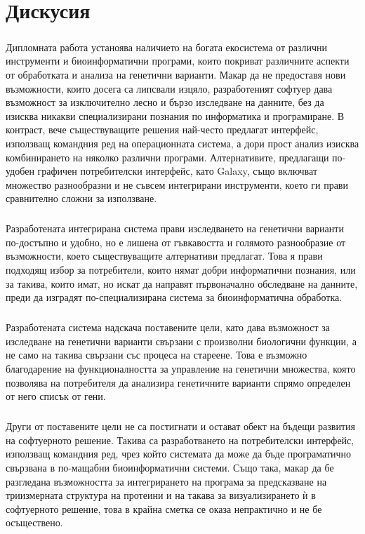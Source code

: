 \documentclass[pdftex,cyrillic,14pt,a4page,twoside,openright]{extreport}
\begin{document}
\chapter{Дискусия}
\paragraph{}
Дипломната работа устаноява наличието на богата екосистема от различни инструменти и биоинформатични програми, които покриват различните аспекти от обработката и анализа на генетични варианти. Макар да не предоставя нови възможности, които досега са липсвали изцяло, разработеният софтуер дава възможност за изключително лесно и бързо изследване на данните, без да изисква никакви специализирани познания по информатика и програмиране. В контраст, вече съществуващите решения най-често предлагат интерфейс, използващ командния ред на операционната система, а дори прост анализ изисква комбинирането на няколко различни програми. Алтернативите, предлагащи по-удобен графичен потребителски интерфейс, като Galaxy, също включват множество разнообразни и не съвсем интегрирани инструменти, което ги прави сравнително сложни за използване.

\paragraph{}
Разработената интегрирана система прави изследването на генетични варианти по-достъпно и удобно, но е лишена от гъвкавостта и голямото разнообразие от възможности, което съществуващите алтернативи предлагат. Това я прави подходящ избор за потребители, които нямат добри информатични познания, или за такива, които имат, но искат да направят първоначално обследване на данните, преди да изградят по-специализирана система за биоинформатична обработка.

\paragraph{}
Разработената система надскача поставените цели, като дава възможност за изследване на генетични варианти свързани с произволни биологични функции, а не само на такива свързани със процеса на стареене. Това е възможно благодарение на функционалността за управление на генетични множества, която позволява на потребителя да анализира генетичните варианти спрямо определен от него списък от гени.

\paragraph{}
Други от поставените цели не са постигнати и остават обект на бъдещи развития на софтуерното решение. Такива са разработването на потребителски интерфейс, използващ командния ред, чрез който системата да може да бъде програматично свързвана в по-мащабни биоинформатични системи. Също така, макар да бе разгледана възможността за интегрирането на програма за предсказване на триизмерната структура на протеини и на такава за визуализирането ѝ в софтуерното решение, това в крайна сметка се оказа непрактично и не бе осъществено.
\end{document}

